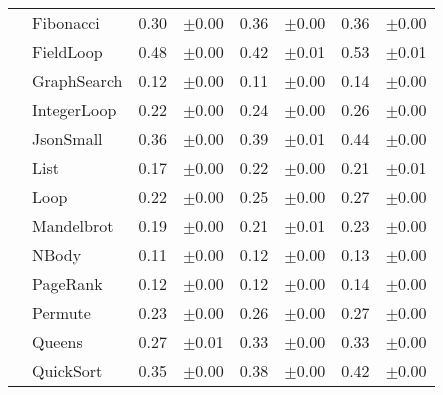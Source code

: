 \begin{tabular}{ll@{\hspace{6pt}}r@{\hspace{3pt}}l@{\hspace{6pt}}r@{\hspace{3pt}}l@{\hspace{6pt}}r@{\hspace{3pt}}l}
 & Fibonacci & 0.30 & \scriptsize\textcolor{gray!60}{$\pm$0.00} & 0.36 & \scriptsize\textcolor{gray!60}{$\pm$0.00} & 0.36 & \scriptsize\textcolor{gray!60}{$\pm$0.00} \\
 & FieldLoop & 0.48 & \scriptsize\textcolor{gray!60}{$\pm$0.00} & 0.42 & \scriptsize\textcolor{gray!60}{$\pm$0.01} & 0.53 & \scriptsize\textcolor{gray!60}{$\pm$0.01} \\
 & GraphSearch & 0.12 & \scriptsize\textcolor{gray!60}{$\pm$0.00} & 0.11 & \scriptsize\textcolor{gray!60}{$\pm$0.00} & 0.14 & \scriptsize\textcolor{gray!60}{$\pm$0.00} \\
 & IntegerLoop & 0.22 & \scriptsize\textcolor{gray!60}{$\pm$0.00} & 0.24 & \scriptsize\textcolor{gray!60}{$\pm$0.00} & 0.26 & \scriptsize\textcolor{gray!60}{$\pm$0.00} \\
 & JsonSmall & 0.36 & \scriptsize\textcolor{gray!60}{$\pm$0.00} & 0.39 & \scriptsize\textcolor{gray!60}{$\pm$0.01} & 0.44 & \scriptsize\textcolor{gray!60}{$\pm$0.00} \\
 & List & 0.17 & \scriptsize\textcolor{gray!60}{$\pm$0.00} & 0.22 & \scriptsize\textcolor{gray!60}{$\pm$0.00} & 0.21 & \scriptsize\textcolor{gray!60}{$\pm$0.01} \\
 & Loop & 0.22 & \scriptsize\textcolor{gray!60}{$\pm$0.00} & 0.25 & \scriptsize\textcolor{gray!60}{$\pm$0.00} & 0.27 & \scriptsize\textcolor{gray!60}{$\pm$0.00} \\
 & Mandelbrot & 0.19 & \scriptsize\textcolor{gray!60}{$\pm$0.00} & 0.21 & \scriptsize\textcolor{gray!60}{$\pm$0.01} & 0.23 & \scriptsize\textcolor{gray!60}{$\pm$0.00} \\
 & NBody & 0.11 & \scriptsize\textcolor{gray!60}{$\pm$0.00} & 0.12 & \scriptsize\textcolor{gray!60}{$\pm$0.00} & 0.13 & \scriptsize\textcolor{gray!60}{$\pm$0.00} \\
 & PageRank & 0.12 & \scriptsize\textcolor{gray!60}{$\pm$0.00} & 0.12 & \scriptsize\textcolor{gray!60}{$\pm$0.00} & 0.14 & \scriptsize\textcolor{gray!60}{$\pm$0.00} \\
 & Permute & 0.23 & \scriptsize\textcolor{gray!60}{$\pm$0.00} & 0.26 & \scriptsize\textcolor{gray!60}{$\pm$0.00} & 0.27 & \scriptsize\textcolor{gray!60}{$\pm$0.00} \\
 & Queens & 0.27 & \scriptsize\textcolor{gray!60}{$\pm$0.01} & 0.33 & \scriptsize\textcolor{gray!60}{$\pm$0.00} & 0.33 & \scriptsize\textcolor{gray!60}{$\pm$0.00} \\
 & QuickSort & 0.35 & \scriptsize\textcolor{gray!60}{$\pm$0.00} & 0.38 & \scriptsize\textcolor{gray!60}{$\pm$0.00} & 0.42 & \scriptsize\textcolor{gray!60}{$\pm$0.00} \\

\end{tabular}
